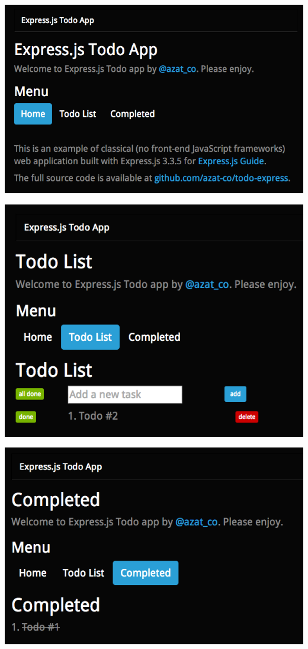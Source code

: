 \documentclass[12pt]{ucthesis}
\newenvironment{Figure}
  {\par\medskip\noindent\minipage{\linewidth}}
  {\endminipage\par\medskip}
\begin{document}
\begin{Figure}
  \centering
  \includegraphics[width=0.75\linewidth]{todo_home.png} 
\end{Figure}

\begin{Figure}
  \centering
  \includegraphics[width=0.75\linewidth]{todo_some_tasks.png}  
\end{Figure}

\begin{Figure}
  \centering
  \includegraphics[width=0.75\linewidth]{todo_completed.png} 
\end{Figure}
\end{document}
